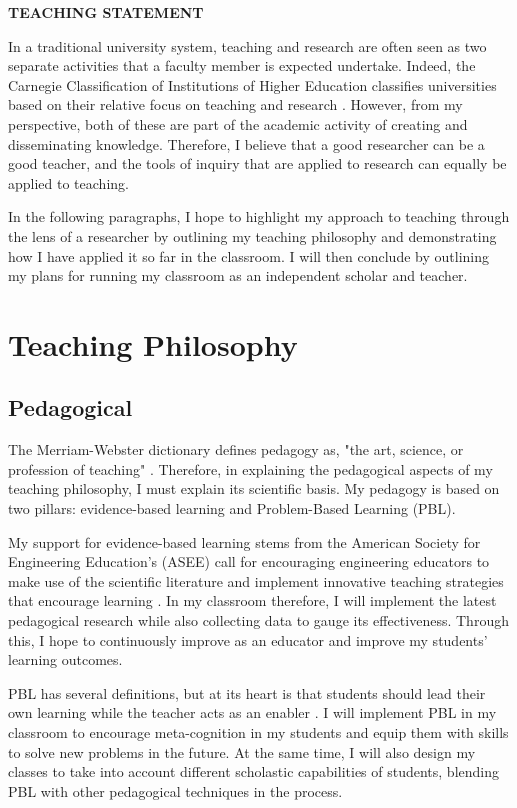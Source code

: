 \documentclass[12pt]{article}
\begin{document}
 \sloppy %
\begin{center}
{\large \uppercase{\textbf{Teaching Statement}}}
\end{center}

In a traditional university system, teaching and research are often seen as two separate activities that a faculty member is expected undertake. Indeed, the Carnegie Classification of Institutions of Higher Education classifies universities based on their relative focus on teaching and research \cite{carnegie1994classification}. However, from my perspective, both of these are part of the academic activity of creating and disseminating knowledge. Therefore, I believe that a good researcher can be a good teacher, and the tools of inquiry that are applied to research can equally be applied to teaching. 

In the following paragraphs, I hope to highlight my approach to teaching through the lens of a researcher by outlining my teaching philosophy and demonstrating how I have applied it so far in the classroom. I will then conclude by outlining my plans for running my classroom as an independent scholar and teacher. 

\section*{Teaching Philosophy}
\subsection*{Pedagogical}
The Merriam-Webster dictionary defines pedagogy as, "the art, science, or profession of teaching" \cite{merriam-webster-pedagogy}. Therefore, in explaining the pedagogical aspects of my teaching philosophy, I must explain its scientific basis. My pedagogy is based on two pillars: evidence-based learning and Problem-Based Learning (PBL). 

My support for evidence-based learning stems from the American Society for Engineering Education's (ASEE) call for encouraging engineering educators to make use of the scientific literature and implement innovative teaching strategies that encourage learning \cite{jamieson2009creating}. In my classroom therefore, I will implement the latest pedagogical research while also collecting data to gauge its effectiveness. Through this, I hope to continuously improve as an educator and improve my students' learning outcomes.

PBL has several definitions, but at its heart is that students should lead their own learning while the teacher acts as an enabler \cite{albanese1993problem}. I will implement PBL in my classroom to encourage meta-cognition in my students and equip them with skills to solve new problems in the future. At the same time, I will also design my classes to take into account different scholastic capabilities of students, blending PBL with other pedagogical techniques in the process.    
\end{document}
